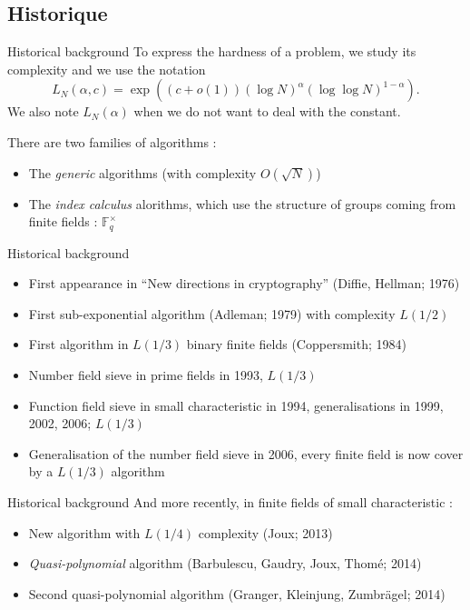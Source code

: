 \documentclass[xcolor=x11names,compress]{beamer}
\theoremstyle{break}
\theoremstyle{sc}
\theoremstyle{definition}
\theoremstyle{remark}
\begin{document}
\subsection{Historique}
\begin{frame}{Historical background}
  To express the hardness of a problem, we study its complexity and we use the
  notation
  \[
    L_N(\alpha, c) = \exp((c+o(1))(\log N)^\alpha(\log\log N)^{1-\alpha}).
  \]
  We also note $L_N(\alpha)$ when we do not want to deal with the constant.

  There are two families of algorithms :
  \begin{itemize}
    \item The \emph{generic} algorithms (with complexity $O(\sqrt N)$)
    \item The \emph{index calculus} alorithms, which use the structure
      of groups coming from finite fields : $\mathbb{F}_{q}^\times$
  \end{itemize}
\end{frame}

\begin{frame}{Historical background}
  \begin{itemize}
    \item First appearance in ``New directions in cryptography'' (Diffie, Hellman; 1976)
    \item First sub-exponential algorithm (Adleman; 1979) with complexity
      $L(1/2)$
  \item First algorithm in $L(1/3)$ binary finite fields
    (Coppersmith; 1984)
  \item Number field sieve in prime fields in 1993,
    $L(1/3)$
  \item Function field sieve in small characteristic in 1994,
    generalisations in 1999, 2002, 2006; $L(1/3)$
  \item Generalisation of the number field sieve in 2006, every finite
    field is now cover by a $L(1/3)$ algorithm
  \end{itemize}
\end{frame}

\begin{frame}{Historical background}
  And more recently, in finite fields of small characteristic :
  \begin{itemize}
    \item New algorithm with $L(1/4)$ complexity (Joux; 2013)
    \item \emph{Quasi-polynomial} algorithm (Barbulescu, Gaudry, Joux, Thomé; 2014)
    \item Second quasi-polynomial algorithm (Granger, Kleinjung, Zumbrägel; 2014)
  \end{itemize}
\end{frame}
\end{document}
